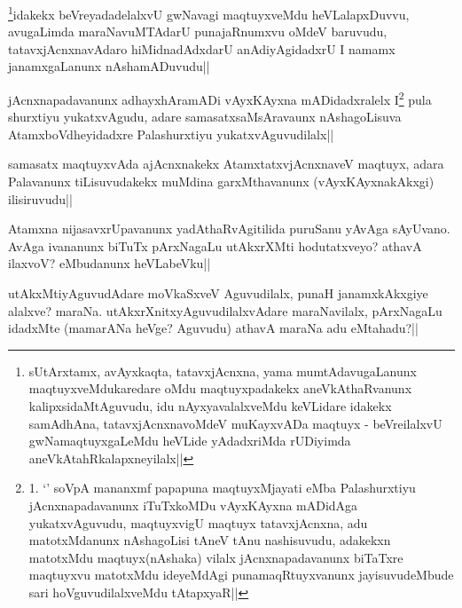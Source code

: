 \begin{artha}
\footnote{sUtArxtamx, avAyxkaqta, tatavxjAcnxna, yama mumtAdavugaLanunx 
maqtuyxveMdukaredare oMdu maqtuyxpadakekx aneVkAthaRvanunx kalipxsidaMtAguvudu, idu 
nAyxyavalalxveMdu keVLidare idakekx samAdhAna, tatavxjAcnxnavoMdeV muKayxvADa maqtuyx -   
beVreilalxvU gwNamaqtuyxgaLeMdu heVLide yAdadxriMda rUDiyimda 
aneVkAtahRkalapxneyilalx||}idakekx 
beVreyadadelalxvU gwNavagi maqtuyxveMdu heVLalapxDuvvu, avugaLimda maraNavuMTAdarU 
punajaRnumxvu oMdeV baruvudu, tatavxjAcnxnavAdaro hiMidnadAdxdarU anAdiyAgidadxrU I namamx 
janamxgaLanunx nAshamADuvudu||
\end{artha}

\begin{artha}
jAcnxnapadavanunx adhayxhAramADi vAyxKAyxna mADidadxralelx I\footnote{1. `\stext' soV\s pA mananxmf papapuna maqtuyxMjayati eMba Palashurxtiyu jAcnxnapadavanunx iTuTxkoMDu vAyxKAyxna mADidAga yukatxvAguvudu, maqtuyxvigU maqtuyx tatavxjAcnxna, adu matotxMdanunx nAshagoLisi tAneV tAnu nashisuvudu, adakekxn matotxMdu maqtuyx(nAshaka) vilalx jAcnxnapadavanunx biTaTxre maqtuyxvu matotxMdu ideyeMdAgi punamaqRtuyxvanunx jayisuvudeMbude sari hoVguvudilalxveMdu tAtapxyaR||} pula shurxtiyu yukatxvAgudu, adare samasatxsaMsAravaunx nAshagoLisuva AtamxboVdheyidadxre Palashurxtiyu yukatxvAguvudilalx||
\end{artha}


\begin{artha}
samasatx maqtuyxvAda ajAcnxnakekx AtamxtatxvjAcnxnaveV maqtuyx, adara Palavanunx tiLisuvudakekx muMdina garxMthavanunx (vAyxKAyxnakAkxgi) ilisiruvudu||
\end{artha}


\begin{artha}
Atamxna nijasavxrUpavanunx yadAthaRvAgitilida puruSanu yAvAga sAyUvano. AvAga ivananunx 
biTuTx pArxNagaLu utAkxrXMti hodutatxveyo? athavA ilaxvoV? eMbudanunx heVLabeVku||
\end{artha}



\begin{artha}
utAkxMtiyAguvudAdare moVkaSxveV Aguvudilalx, punaH janamxkAkxgiye alalxve? maraNa. 
utAkxrXnitxyAguvudilalxvAdare maraNavilalx, pArxNagaLu idadxMte (mamarANa heVge? Aguvudu) 
athavA maraNa adu eMtahadu?||
\end{artha}

